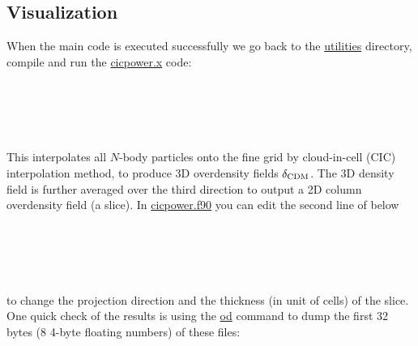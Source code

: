 \documentclass[12pt]{article}
\newcommand{\tcx}{\textcolor{teal}}
\begin{document}
\subsection{Visualization}
When the main code is executed successfully we go back to the \url{utilities} directory, compile and run the \url{cicpower.x} code:
\\\\
\\
\\
\\
\\
This interpolates all $N$-body particles onto the fine grid by cloud-in-cell (CIC) interpolation method, to produce 3D overdensity fields $\delta_{\rm CDM}$. The 3D density field is further averaged over the third direction to output a 2D column overdensity field (a slice). In \url{cicpower.f90} you can edit the second line of below
\\\\
\\
\indent {\tt write(11) \url{sum(rho_c(:,:,:),dim=3)/ng}  \tcx{!\ sum over the 3rd dimension and average}}\\
\\
\\
to change the projection direction and the thickness (in unit of cells) of the slice. One quick check of the results is using the \url{od} command to dump the first 32 bytes (8 4-byte floating numbers) of these files:
\\\\
\\
\\
\\
\\
\\
\\
\\
\end{document}
